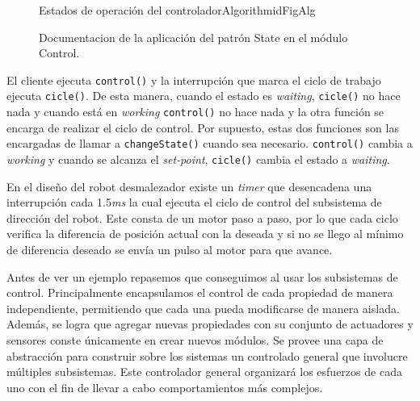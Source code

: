 \begin{figure}
\caption{Documentacion de la aplicación del patrón State en el módulo Control.}
\label{docStateControl}
\begin{pattern}[]{Estados de operación del controlador}{Algorithm}{idFigAlg}
\assigns
{}
\end{pattern}
\end{figure}


El cliente ejecuta \verb|control()| y la interrupción que marca el ciclo de trabajo ejecuta \verb|cicle()|. De esta manera, cuando el estado es \textit{waiting}, \verb|cicle()| no hace nada y cuando está en \textit{working} \verb|control()| no hace nada y la otra función se encarga de realizar el ciclo de control.
Por supuesto, estas dos funciones son las encargadas de llamar a \verb|changeState()| cuando sea necesario. \verb|control()| cambia a \textit{working} y cuando se alcanza el \textit{set-point}, \verb|cicle()| cambia el estado a \textit{waiting}.

En el diseño del robot desmalezador \cite{paperPomponio} existe un \textit{timer} que desencadena una interrupción cada 1.5\textit{ms} la cual ejecuta el ciclo de control del subsistema de dirección del robot. Este consta de un motor paso a paso, por lo que cada ciclo verifica la diferencia de posición actual con la deseada y si no se llego al mínimo de diferencia deseado se envía un pulso al motor para que avance.

Antes de ver un ejemplo repasemos que conseguimos al usar los subsistemas de control. Principalmente encapsulamos el control de cada propiedad de manera independiente, permitiendo que cada una pueda modificarse de manera aislada. Además, se logra que agregar nuevas propiedades con su conjunto de actuadores y sensores conste únicamente en crear nuevos módulos. Se provee una capa de abstracción para construir sobre los sistemas un controlado general que involucre múltiples subsistemas. Este controlador general organizará los esfuerzos de cada uno con el fin de llevar a cabo comportamientos más complejos.

